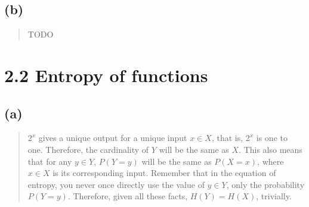 \documentclass{article}
\begin{document}
\subsection*{(b)} 
\begin{quote}
	TODO
\end{quote}

\section*{2.2 Entropy of functions}
\subsection*{(a)}
\begin{quote}
	$2^x$ gives a unique output for a unique input $x \in X$, that is, $2^x$ is one to one. Therefore, the cardinality of $Y$ will be the same as $X$. This also means that for any $y \in Y$, $P(Y=y)$ will be the same as $P(X=x)$, where $x \in X$ is its corresponding input. Remember that in the equation of entropy, you never once directly use the value of $y \in Y$, only the probability $P(Y=y)$. Therefore, given all these facts, $H(Y) = H(X)$, trivially.
\end{quote}
\end{document}
